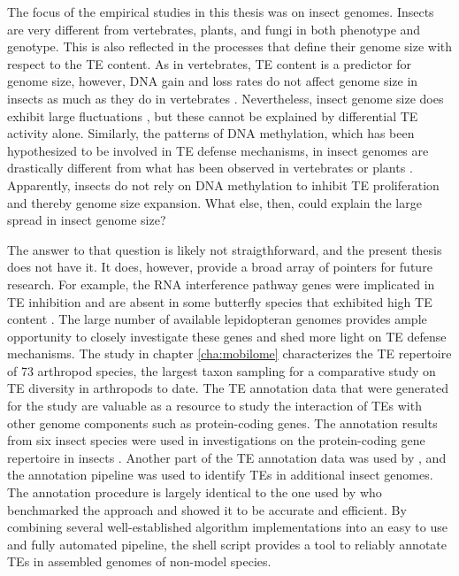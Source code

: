 The focus of the empirical studies in this thesis was on insect genomes.
Insects are very different from vertebrates, plants, and fungi in both
phenotype and genotype. This is also reflected in the processes that
define their genome size with respect to the TE content. As in
vertebrates, TE content is a predictor for genome size, however,  DNA
gain and loss rates do not affect genome size in insects as much as they
do in vertebrates \citep{Kapusta2017-1,Lindblad-Toh2005}.  Nevertheless,
insect genome size does exhibit large fluctuations \citep{Alfsnes2017},
but these cannot be explained by differential TE activity alone.
Similarly, the patterns of DNA methylation, which has been hypothesized
to be involved in TE defense mechanisms, in insect genomes are
drastically different from what has been observed in vertebrates or
plants \citep{Provataris2018,Suzuki2008}.  Apparently, insects do not
rely on DNA methylation to inhibit TE proliferation and thereby genome
size expansion. What else, then, could explain the large spread in
insect genome size?

The answer to that question is likely not straigthforward, and the
present thesis does not have it. It does, however, provide a broad array
of pointers for future research. For example, the RNA interference
pathway genes were implicated in TE inhibition
\citep{Aravin2001,Czech2008} and are absent in some butterfly species
that exhibited high TE content \citep{Dowling2017}. The large number of
available lepidopteran genomes provides ample opportunity to closely
investigate these genes and shed more light on TE defense mechanisms.
The study in chapter \ref{cha:mobilome} characterizes the TE repertoire
of 73 arthropod species, the largest taxon sampling for a comparative
study on TE diversity in arthropods to date. The TE annotation data
that were generated for the study are valuable as a resource to study
the interaction of TEs with other genome components such as
protein-coding genes. The annotation results from six insect species
 were used in investigations on the
protein-coding gene repertoire in insects .
Another part of the TE annotation data was used by
\citep{Provataris2018}, and the annotation pipeline was used to identify
TEs in additional insect genomes. The annotation procedure is largely
identical to the one used by \citet{Reinar2016} who benchmarked the
approach and showed it to be accurate and efficient. By combining
several well-established algorithm implementations into an easy to use
and fully automated pipeline, the shell script provides a tool to
reliably annotate TEs in assembled genomes of non-model species. 

